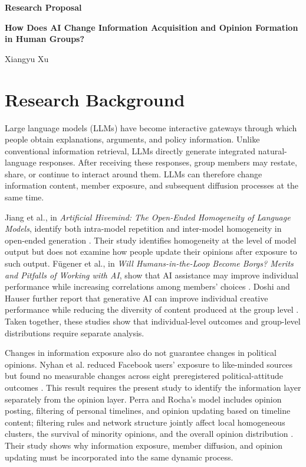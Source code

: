 \documentclass[11pt,a4paper]{article}
\begin{document}
\begin{titlepage}
\centering
\vspace*{2.5cm}
{\sffamily\bfseries\color{navy}\LARGE Research Proposal\par}
\vspace{1.2cm}
{\sffamily\bfseries\Huge How Does AI Change Information Acquisition and Opinion Formation in Human Groups?\par}
\vspace{1.5cm}
{\sffamily\Large Xiangyu Xu\par}
\vfill
\end{titlepage}

\section{Research Background}

Large language models (LLMs) have become interactive gateways through which people obtain explanations, arguments, and policy information. Unlike conventional information retrieval, LLMs directly generate integrated natural-language responses. After receiving these responses, group members may restate, share, or continue to interact around them. LLMs can therefore change information content, member exposure, and subsequent diffusion processes at the same time.

Jiang et al., in \emph{Artificial Hivemind: The Open-Ended Homogeneity of Language Models}, identify both intra-model repetition and inter-model homogeneity in open-ended generation \cite{jiang2025}. Their study identifies homogeneity at the level of model output but does not examine how people update their opinions after exposure to such output. F\"ugener et al., in \emph{Will Humans-in-the-Loop Become Borgs? Merits and Pitfalls of Working with AI}, show that AI assistance may improve individual performance while increasing correlations among members' choices \cite{fugener2021}. Doshi and Hauser further report that generative AI can improve individual creative performance while reducing the diversity of content produced at the group level \cite{doshi2024}. Taken together, these studies show that individual-level outcomes and group-level distributions require separate analysis.

Changes in information exposure also do not guarantee changes in political opinions. Nyhan et al. reduced Facebook users' exposure to like-minded sources but found no measurable changes across eight preregistered political-attitude outcomes \cite{nyhan2023}. This result requires the present study to identify the information layer separately from the opinion layer. Perra and Rocha's model includes opinion posting, filtering of personal timelines, and opinion updating based on timeline content; filtering rules and network structure jointly affect local homogeneous clusters, the survival of minority opinions, and the overall opinion distribution \cite{perra2019}. Their study shows why information exposure, member diffusion, and opinion updating must be incorporated into the same dynamic process.
\end{document}
